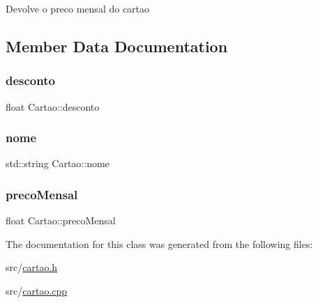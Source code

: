 Devolve o preco mensal do cartao 

\subsection{Member Data Documentation}
\mbox{\label{class_cartao_a9abef37fa118bed1459d3c273c79a76a}} 
\subsubsection{\texorpdfstring{desconto}{desconto}}
{\footnotesize\ttfamily float Cartao\+::desconto\hspace{0.3cm}{\ttfamily [private]}}

\mbox{\label{class_cartao_a831b64c396e3903ff85c8165640eb41a}} 
\subsubsection{\texorpdfstring{nome}{nome}}
{\footnotesize\ttfamily std\+::string Cartao\+::nome\hspace{0.3cm}{\ttfamily [private]}}

\mbox{\label{class_cartao_adfaee23e98127abf18d04e93aa453f57}} 
\subsubsection{\texorpdfstring{preco\+Mensal}{precoMensal}}
{\footnotesize\ttfamily float Cartao\+::preco\+Mensal\hspace{0.3cm}{\ttfamily [private]}}



The documentation for this class was generated from the following files\+:\begin{DoxyCompactItemize}
\item 
src/\mbox{\hyperlink{cartao_8h}{cartao.\+h}}\item 
src/\mbox{\hyperlink{cartao_8cpp}{cartao.\+cpp}}\end{DoxyCompactItemize}
